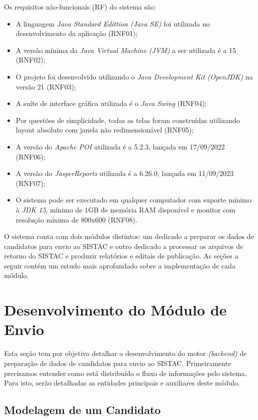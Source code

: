 \documentclass[
	12pt,			%
	openright,		%
	oneside,	
	a4paper,		%
	english,		%
	brazil			%
]{abntex2/abntex2}  %
\begin{document}
	Os requisitos não-funcionais (RF) do sistema são:
	
	\begin{itemize}
		
		\item A linguagem \textit{Java Standard Edittion (Java SE)} foi utilizada no desenvolvimento da aplicação (RNF01);
		\item A versão mínima da \textit{Java Virtual Machine (JVM)} a ser utilizada é a 15 (RNF02);
		\item O projeto foi desenvolvido utilizando o \textit{Java Development Kit (OpenJDK)} na versão 21 (RNF03);
		\item A suíte de interface gráfica utilizada é o \textit{Java Swing} (RNF04);
		\item Por questões de simplicidade, todas as telas foram construídas utilizando layout absoluto com janela não redimensionável (RNF05);
		\item A versão do \textit{Apache POI} utilizada é a 5.2.3, lançada em 17/09/2022 (RNF06);
		\item A versão do \textit{JasperReports\textregistered} utilizada é a 6.26.0, lançada em 11/09/2023 (RNF07);
		\item O sistema pode ser executado em qualquer computador com suporte mínimo à \textit{JDK 15}, mínimo de 1GB de memória RAM disponível e monitor com resolução mínima de 800x600 (RNF08).
		
	\end{itemize}
	
	O sistema conta com dois módulos distintos: um dedicado a preparar os dados de candidatos para envio ao SISTAC e outro dedicado a processar os arquivos de retorno do SISTAC e produzir relatórios e editais de publicação. As seções a seguir contém um estudo mais aprofundado sobre a implementação de cada módulo.

	\section{Desenvolvimento do Módulo de Envio}
	
	Esta seção tem por objetivo detalhar o desenvolvimento do motor \textit{(backend)} de preparação de dados de candidatos para envio ao SISTAC. Primeiramente precisamos entender como está distribuído o fluxo de informações pelo sistema. Para isto, serão detalhadas as entidades principais e auxiliares deste módulo.
	
	\subsection{Modelagem de um Candidato} \label{candidato}
	
\end{document}

